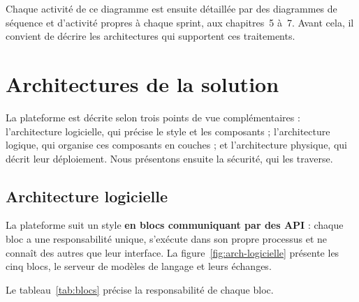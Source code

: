 
Chaque activité de ce diagramme est ensuite détaillée par des diagrammes de séquence et d'activité propres à chaque sprint, aux chapitres~5 à~7. Avant cela, il convient de décrire les architectures qui supportent ces traitements.

\section{Architectures de la solution}

La plateforme est décrite selon trois points de vue complémentaires : l'architecture logicielle, qui précise le style et les composants ; l'architecture logique, qui organise ces composants en couches ; et l'architecture physique, qui décrit leur déploiement. Nous présentons ensuite la sécurité, qui les traverse.

\subsection{Architecture logicielle}

La plateforme suit un style \textbf{en blocs communiquant par des API} : chaque bloc a une responsabilité unique, s'exécute dans son propre processus et ne connaît des autres que leur interface. La figure~\ref{fig:arch-logicielle} présente les cinq blocs, le serveur de modèles de langage et leurs échanges.


Le tableau~\ref{tab:blocs} précise la responsabilité de chaque bloc.

